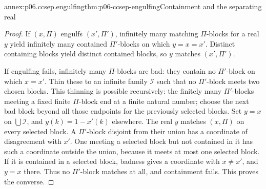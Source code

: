 \begin{annexitem}{annex:p06.ccsep.engulfing}{thm:p06-ccsep-engulfing}{Containment and the separating real}
\begin{proof}
If \((x,\Pi)\) engulfs \((x',\Pi')\), infinitely many matching
\(\Pi\)-blocks for a real \(y\) yield infinitely many contained
\(\Pi'\)-blocks on which \(y=x=x'\). Distinct containing blocks
yield distinct contained blocks, so \(y\) matches \((x',\Pi')\).

If engulfing fails, infinitely many \(\Pi\)-blocks are bad: they
contain no \(\Pi'\)-block on which \(x=x'\). Thin these to an
infinite family \(\mathcal I\) such that no \(\Pi'\)-block
meets two chosen blocks. This thinning is possible recursively:
the finitely many \(\Pi'\)-blocks meeting a fixed finite
\(\Pi\)-block end at a finite natural number; choose the next
bad block beyond all those endpoints for the previously selected
blocks. Set \(y=x\) on \(\bigcup\mathcal I\), and
\(y(k)=1-x'(k)\) elsewhere. The real \(y\) matches \((x,\Pi)\)
on every selected block. A \(\Pi'\)-block disjoint from their
union has a coordinate of disagreement with \(x'\). One meeting
a selected block but not contained in it has such a coordinate
outside the union, because it meets at most one selected block.
If it is contained in a selected block, badness gives a coordinate
with \(x\ne x'\), and \(y=x\) there. Thus no \(\Pi'\)-block
matches at all, and containment fails. This proves the converse.
\end{proof}
\end{annexitem}

